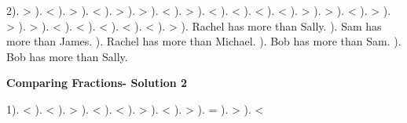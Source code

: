 \documentclass{article}%
\begin{document}
2). >%
). <%
). >%
). <%
). >%
). >%
). <%
). >%
). <%
). <%
). <%
). <%
). >%
). >%
). <%
). >%
). >%
). >%
). <%
). <%
). <%
). <%
). <%
). >%
). Rachel has more than Sally.%
). Sam has more than James.%
). Rachel has more than Michael.%
). Bob has more than Sam.%
). Bob has more than Sally.%
\newline%
\newpage%
\large%
\begin{center}%
\textbf{Comparing Fractions- Solution 2}%
\newline%
\end{center} \normalsize%
1). <%
). <%
). >%
). <%
). <%
). >%
). <%
). >%
). =%
). >%
). <%
\end{document}
